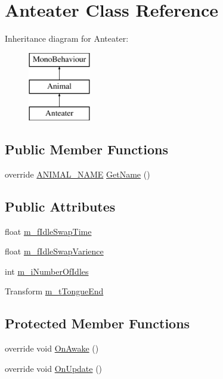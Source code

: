 \hypertarget{class_anteater}{}\section{Anteater Class Reference}
\label{class_anteater}
Inheritance diagram for Anteater\+:\begin{figure}[H]
\begin{center}
\leavevmode
\includegraphics[height=3.000000cm]{class_anteater}
\end{center}
\end{figure}
\subsection*{Public Member Functions}
\begin{DoxyCompactItemize}
\item 
override \mbox{\hyperlink{_animal_8cs_a2fa5713399b84d1b88dae9196837af50}{A\+N\+I\+M\+A\+L\+\_\+\+N\+A\+ME}} \mbox{\hyperlink{class_anteater_a35cbc4139c1215562db29102ed07646a}{Get\+Name}} ()
\end{DoxyCompactItemize}
\subsection*{Public Attributes}
\begin{DoxyCompactItemize}
\item 
float \mbox{\hyperlink{class_anteater_a6607e1bdc99981d48478a5c213c5dbc7}{m\+\_\+f\+Idle\+Swap\+Time}}
\item 
float \mbox{\hyperlink{class_anteater_aa2254c4952bfd178fd5faafdefe4d67e}{m\+\_\+f\+Idle\+Swap\+Varience}}
\item 
int \mbox{\hyperlink{class_anteater_a1bbf947ef90b8367b0935b7ceea93d69}{m\+\_\+i\+Number\+Of\+Idles}}
\item 
Transform \mbox{\hyperlink{class_anteater_a2d6c79cdf7e28a184c8867cabb23b377}{m\+\_\+t\+Tongue\+End}}
\end{DoxyCompactItemize}
\subsection*{Protected Member Functions}
\begin{DoxyCompactItemize}
\item 
override void \mbox{\hyperlink{class_anteater_a616439e723d734df132d25a0a69f2e4a}{On\+Awake}} ()
\item 
override void \mbox{\hyperlink{class_anteater_a51eaca4815562f28e36517999ed5b77f}{On\+Update}} ()
\end{DoxyCompactItemize}
